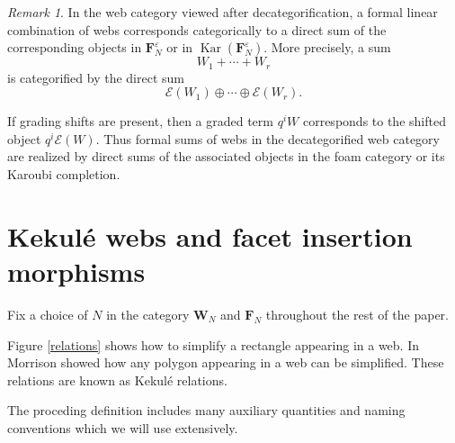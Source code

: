 \documentclass[12pt]{amsart}
\theoremstyle{definition}
\theoremstyle{remark}
\newtheorem{remark}[theorem]{Remark}
\numberwithin{equation}{section}
\numberwithin{figure}{section}
\newcommand{\Web}{\mathbf{W}_N}
\newcommand{\Kar}{\operatorname{Kar}}
\newcommand{\Foam}{\mathbf{F}_N}
\begin{document}
\begin{remark}
In the web category viewed after decategorification, a formal linear
combination of webs corresponds categorically to a direct sum of the
corresponding objects in $\Foam^\varepsilon$ or in
$\Kar(\Foam^\varepsilon)$. More precisely, a sum
\[
W_1+\cdots+W_r
\]
is categorified by the direct sum
\[
\mathcal{E}(W_1)\oplus\cdots\oplus\mathcal{E}(W_r).
\]

If grading shifts are present, then a graded term $q^iW$ corresponds to the
shifted object $q^i\mathcal{E}(W)$. Thus formal sums of webs in the
decategorified web category are realized by direct sums of the associated
objects in the foam category or its Karoubi completion.
\end{remark}


\section{Kekulé webs and facet insertion morphisms}

Fix a choice of $N$ in the category $\Web$ and $\Foam$ throughout the rest of the paper. 

Figure \ref{relations} shows how to simplify a rectangle appearing in a web. In \cite[Section 1.1]{Mor2007} Morrison showed how any polygon appearing in a web can be simplified. These relations are known as Kekulé relations.

The proceding definition includes many auxiliary quantities and naming conventions which we will use extensively.
\end{document}
